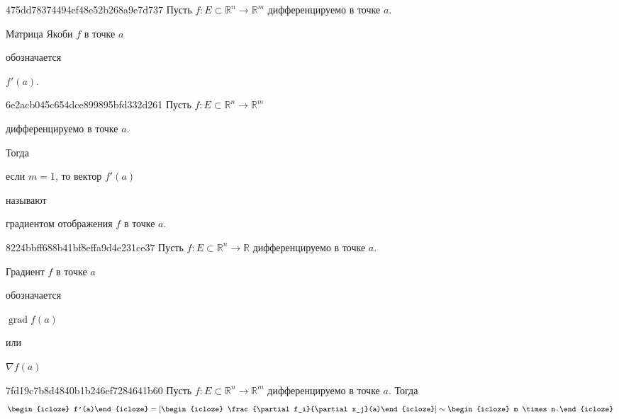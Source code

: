 \begin{note}{475dd78374494ef48e52b268a9e7d737}
    Пусть \({ f : E \subset \mathbb R^{n} \to \mathbb R^{m} }\) дифференцируемо в точке \({ a }\).
    \begin{icloze}{2}Матрица Якоби \({ f }\) в точке \({ a }\)\end{icloze} обозначается \begin{icloze}{1}\({ f'(a) }\).\end{icloze}
\end{note}

\begin{note}{6e2acb045c654dce899895bfd332d261}
    Пусть \({ f : E \subset \mathbb R^{n} \to \mathbb R^{m} }\) \begin{icloze}{3}дифференцируемо в точке \({ a }\).\end{icloze}
    Тогда \begin{icloze}{1}если \({ m = 1 }\), то вектор \({ f'(a) }\)\end{icloze} называют \begin{icloze}{2}градиентом отображения \({ f }\) в точке \({ a }\).\end{icloze}
\end{note}

\begin{note}{8224bbff688b41bf8effa9d4e231ce37}
    Пусть \({ f : E \subset \mathbb R^{n} \to \mathbb R }\) дифференцируемо в точке \({ a }\).
    \begin{icloze}{2}Градиент \({ f }\) в точке \({ a }\)\end{icloze} обозначается \begin{icloze}{1}\({ \operatorname{grad} f(a) }\)\end{icloze} или \begin{icloze}{1}\({ \nabla f(a) }\)\end{icloze}
\end{note}

\begin{note}{7fd19c7b8d4840b1b246ef7284641b60}
    Пусть \({ f : E \subset \mathbb R^{n} \to \mathbb R^{m} }\) дифференцируемо в точке \({ a }\).
    Тогда
    \[
        \begin{icloze}{3}f'(a)\end{icloze} = \left[ \begin{icloze}{1}\frac{\partial f_i}{\partial x_j}(a)\end{icloze} \right] \sim \begin{icloze}{2}m \times n.\end{icloze}
    \]
\end{note}

